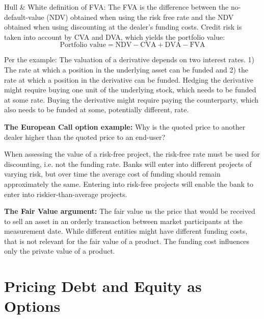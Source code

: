 \documentclass[10pt,a4paper]{article}
\begin{document}
            Hull \& White definition of FVA: The FVA is the difference between the no-default-value (NDV) obtained when using the risk free rate and the NDV obtained when using discounting at the dealer's funding costs. Credit risk is taken into account by CVA and DVA, which yields the portfolio value:
            \begin{equation}
                \text{Portfolio value} = \text{NDV} - \text{CVA} + \text{DVA} - \text{FVA}
            \end{equation}

            Per the example: The valuation of a derivative depends on two interest rates. 1) The rate at which a position in the underlying asset can be funded and 2) the rate at which a position in the derivative can be funded. Hedging the derivative might require buying one unit of the underlying stock, which needs to be funded at some rate. Buying the derivative might require paying the counterparty, which also needs to be funded at some, potentially different, rate.
            
            \textbf{The European Call option example:} Why is the quoted price to another dealer higher than the quoted price to an end-user?
            
            When assessing the value of a risk-free project, the risk-free rate must be used for discounting, i.e. not the funding rate. Banks will enter into different projects of varying risk, but over time the average cost of funding should remain approximately the same. Entering into risk-free projects will enable the bank to enter into riskier-than-average projects.
            
            \textbf{The Fair Value argument:} The fair value us the price that would be received to sell an asset in an orderly transaction between market participants at the measurement date. While different entities might have different funding costs, that is not relevant for the fair value of a product. The funding cost influences only the private value of a product.
    
    \section{Pricing Debt and Equity as Options}
\end{document}
